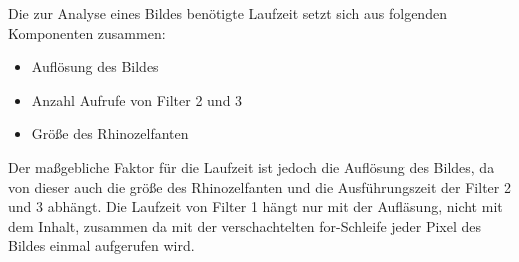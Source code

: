 Die zur Analyse eines Bildes benötigte Laufzeit setzt sich aus folgenden Komponenten zusammen:

\begin{itemize}
	\item Auflösung des Bildes
	\item Anzahl Aufrufe von Filter 2 und 3
	\item Größe des Rhinozelfanten
\end{itemize}

Der maßgebliche Faktor für die Laufzeit ist jedoch die Auflösung des Bildes, da von dieser auch die größe des Rhinozelfanten und die Ausführungszeit der Filter 2 und 3 abhängt. Die Laufzeit von Filter 1 hängt nur mit der Aufläsung, nicht mit dem Inhalt, zusammen da mit der verschachtelten for-Schleife jeder Pixel des Bildes einmal aufgerufen wird.